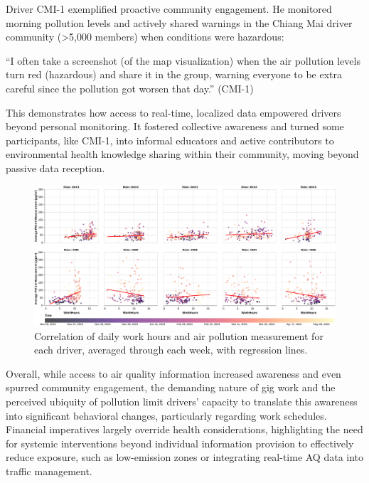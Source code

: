 Driver CMI-1 exemplified proactive community engagement.
He monitored morning pollution levels and actively shared warnings in the Chiang Mai \grab{} driver community (>5,000 members) when conditions were hazardous:

\begin{quoteb}
 ``I often take a screenshot (of the map visualization) when the air pollution levels turn red (hazardous) and share it in the group, warning everyone to be extra careful since the pollution got worsen that day.'' (CMI-1)
\end{quoteb}

This demonstrates how access to real-time, localized data empowered drivers beyond personal monitoring.
It fostered collective awareness and turned some participants, like CMI-1, into informal educators and active contributors to environmental health knowledge sharing within their community, moving beyond passive data reception.

\begin{figure}
    \centering
    \includegraphics[width=\textwidth]{figures/work-hours-vs-aqi-per-rider-regression.pdf}
    \caption{Correlation of daily work hours and air pollution measurement for each driver, averaged through each week, with regression lines.
    }
    \Description{}
    \label{fig:work-hours-vs-aqi-per-rider}
\end{figure}

Overall, while access to air quality information increased awareness and even spurred community engagement, the demanding nature of gig work and the perceived ubiquity of pollution limit drivers' capacity to translate this awareness into significant behavioral changes, particularly regarding work schedules.
Financial imperatives largely override health considerations, highlighting the need for systemic interventions beyond individual information provision to effectively reduce exposure, such as low-emission zones or integrating real-time AQ data into traffic management.